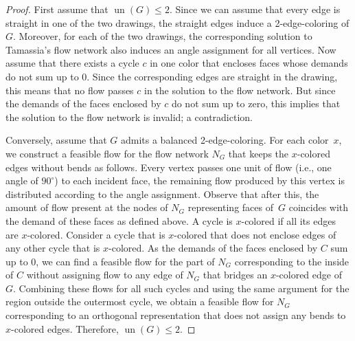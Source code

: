 \documentclass[runningheads]{llncs}
\newcommand{\un}{\operatorname{un}}
\begin{document}
\begin{proof}
    First assume that $\un(G) \leq 2$.
	Since we can assume that every edge is straight in %
    one of the two drawings, the straight edges induce a 2-edge-coloring of $G$.
	Moreover, for each of the two drawings, the corresponding solution to Tamassia's flow network also induces an angle assignment for all vertices.
	Now assume that there exists a cycle $c$ in one color that encloses faces whose demands do not sum up to 0.
	Since the corresponding edges are straight in the drawing, this means that no flow passes $c$ in the solution to the flow network.
	But since the demands of the faces enclosed by $c$ do not sum up to zero, this implies that the solution to the flow network is invalid; a contradiction.
 
    Conversely, assume that $G$ admits a balanced 2-edge-coloring.
	For each color~$x$, we construct a feasible flow for the flow network $N_G$ that keeps the $x$-colored edges without bends as follows.
	Every vertex passes one unit of flow (i.e., one angle of $90^\circ$)
    to each incident face, the remaining flow produced by this vertex
    is distributed according to the angle assignment.
	Observe that after this, the amount of flow present at the nodes of $N_G$
    representing faces of~$G$ coincides with the demand of these faces as defined above.
    A cycle is $x$-colored if all its edges are $x$-colored. 
    Consider a cycle that is $x$-colored that does not enclose edges of any other cycle that is $x$-colored.
	As the demands of the faces enclosed by $C$ sum up to 0, we can find a feasible flow for the part of $N_G$ corresponding to the inside of $C$ without assigning flow to any edge of $N_G$ that bridges an $x$-colored edge of~$G$.
	Combining these flows for all such cycles and using the same argument for the region outside the outermost cycle, we obtain a feasible flow for $N_G$
    corresponding to an orthogonal representation that does not assign any bends to $x$-colored edges.
    Therefore, $\un(G) \le 2$.
\end{proof}

\Counterexamples*
\label{pro:counterexamples*}
\end{document}
